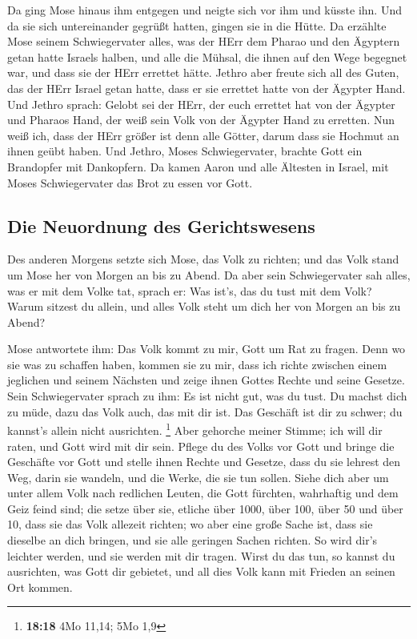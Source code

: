  Da ging Mose hinaus ihm entgegen und neigte sich vor ihm
und küsste ihn. Und da sie sich untereinander gegrüßt hatten, gingen sie
in die Hütte.  Da erzählte Mose seinem Schwiegervater
alles, was der HErr dem Pharao und den Ägyptern getan hatte Israels
halben, und alle die Mühsal, die ihnen auf den Wege begegnet war, und
dass sie der HErr errettet hätte.  Jethro aber freute sich
all des Guten, das der HErr Israel getan hatte, dass er sie errettet
hatte von der Ägypter Hand.  Und Jethro sprach: Gelobt
sei der HErr, der euch errettet hat von der Ägypter und Pharaos Hand,
der weiß sein Volk von der Ägypter Hand zu erretten.  Nun
weiß ich, dass der HErr größer ist denn alle Götter, darum dass sie
Hochmut an ihnen geübt haben.  Und Jethro, Moses
Schwiegervater, brachte Gott ein Brandopfer mit Dankopfern. Da kamen
Aaron und alle Ältesten in Israel, mit Moses Schwiegervater das Brot zu
essen vor Gott.

\hypertarget{die-neuordnung-des-gerichtswesens}{%
\subsection{Die Neuordnung des
Gerichtswesens}\label{die-neuordnung-des-gerichtswesens}}

 Des anderen Morgens setzte sich Mose, das Volk zu
richten; und das Volk stand um Mose her von Morgen an bis zu Abend.
 Da aber sein Schwiegervater sah alles, was er mit dem
Volke tat, sprach er: Was ist's, das du tust mit dem Volk? Warum sitzest
du allein, und alles Volk steht um dich her von Morgen an bis zu Abend?

 Mose antwortete ihm: Das Volk kommt zu mir, Gott um Rat
zu fragen.  Denn wo sie was zu schaffen haben, kommen sie
zu mir, dass ich richte zwischen einem jeglichen und seinem Nächsten und
zeige ihnen Gottes Rechte und seine Gesetze.  Sein
Schwiegervater sprach zu ihm: Es ist nicht gut, was du tust.
 Du machst dich zu müde, dazu das Volk auch, das mit dir
ist. Das Geschäft ist dir zu schwer; du kannst's allein nicht
ausrichten. \footnote{\textbf{18:18} 4Mo 11,14; 5Mo 1,9} 
Aber gehorche meiner Stimme; ich will dir raten, und Gott wird mit dir
sein. Pflege du des Volks vor Gott und bringe die Geschäfte vor Gott
 und stelle ihnen Rechte und Gesetze, dass du sie lehrest
den Weg, darin sie wandeln, und die Werke, die sie tun sollen.
 Siehe dich aber um unter allem Volk nach redlichen
Leuten, die Gott fürchten, wahrhaftig und dem Geiz feind sind; die setze
über sie, etliche über 1000, über 100, über 50 und über 10,
 dass sie das Volk allezeit richten; wo aber eine große
Sache ist, dass sie dieselbe an dich bringen, und sie alle geringen
Sachen richten. So wird dir's leichter werden, und sie werden mit dir
tragen.  Wirst du das tun, so kannst du ausrichten, was
Gott dir gebietet, und all dies Volk kann mit Frieden an seinen Ort
kommen.

